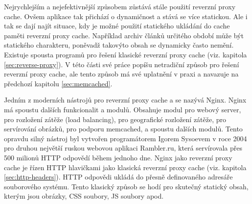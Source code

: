 \documentclass[12pt]{article}
\begin{document}
\obrazek
{}

\clearpage

\obrazek
{}


\label{sec:reverse-proxy-cache}
Nejrychlejším a nejefektivnější způsobem zůstává stále použití reverzní proxy cache. Ovšem aplikace tak přichází o dynamičnost a stává se více statickou. Ale i tak se dají najít situace, kdy je možné použití statického ukládání do cache paměti reverzní proxy cache. Například archiv článků určitého období může být statického charakteru, poněvadž takovýto obsah se dynamicky často nemění. Existuje spousta programů pro řešení klasické reverzní proxy cache (viz. kapitola \ref{sec:reverse-proxy}). V této části své práce popíšu netradiční způsob pro řešení reverzní proxy cache, ale tento způsob má své uplatnění v praxi a navazuje na předchozí kapitolu \ref{sec:memcached}.

Jedním z moderních nástrojů pro reverzní proxy cache a se nazývá Nginx. Nginx má spoustu dalších funkcionalit a modulů. Obsahuje modul pro webový server, pro rozložení zátěže (load balancing), pro geografické rozložení zátěže, pro servírování obrázků, pro podporu memcached, a spoustu dalších modulů. Tento opravdu silný nástroj byl vytvořen programátorem Igorem Sysoevem v roce 2004 pro druhou největší ruskou webovou aplikaci Rambler.ru, která servírovala přes 500 milionů HTTP odpovědí během jednoho dne. Nginx jako reverzní proxy cache je řízen HTTP hlavičkami jako klasická reverzní proxy cache (viz. kapitola \ref{sec:http-headers}). HTTP odpovědi ukládá do přesně definovaného adresáře souborového systému. Tento klasický způsob se hodí pro skutečný statický obsah, kterým jsou obrázky, CSS soubory, JS soubory apod.\cite{nginx}
\end{document}
